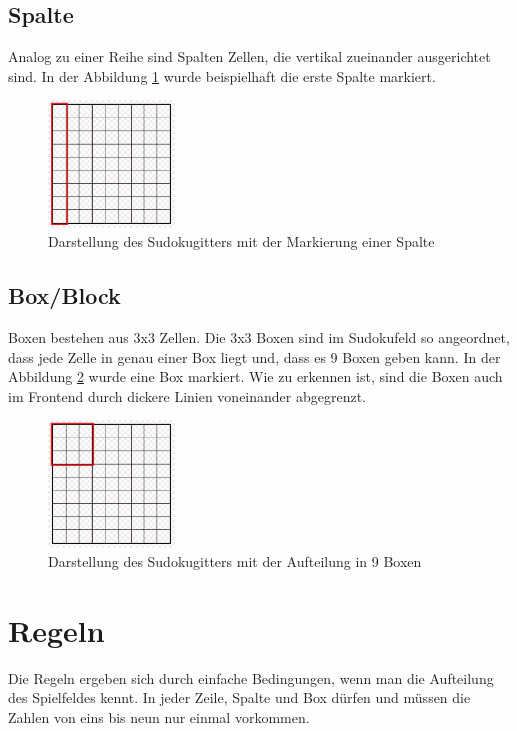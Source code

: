 \subsection{Spalte}
Analog zu einer Reihe sind Spalten Zellen, die vertikal zueinander ausgerichtet sind. In der Abbildung \ref{fig:SudokugitterSpalte} wurde beispielhaft die erste Spalte markiert.
\begin{figure}[htbp]
	\centering
	\includegraphics[width=0.3\textwidth]{images/sudokugitterSpalte.jpg}
	\caption{Darstellung des Sudokugitters mit der Markierung einer Spalte}
	\label{fig:SudokugitterSpalte}
\end{figure}

\subsection{Box/Block}
Boxen bestehen aus 3x3 Zellen. Die 3x3 Boxen sind im Sudokufeld so angeordnet, dass jede Zelle in genau einer Box liegt und, dass es 9 Boxen geben kann. In der Abbildung \ref{fig:SudokugitterBox} wurde eine Box markiert. Wie zu erkennen ist, sind die Boxen auch im Frontend durch dickere Linien voneinander abgegrenzt. 
\begin{figure}[htbp]
	\centering
	\includegraphics[width=0.3\textwidth]{images/sudokugitterBox.jpg}
	\caption{Darstellung des Sudokugitters mit der Aufteilung in 9 Boxen}
	\label{fig:SudokugitterBox}
\end{figure}

\section{Regeln}
Die Regeln ergeben sich durch einfache Bedingungen, wenn man die Aufteilung des Spielfeldes kennt. In jeder Zeile, Spalte und Box dürfen und müssen die Zahlen von eins bis neun nur einmal vorkommen.

